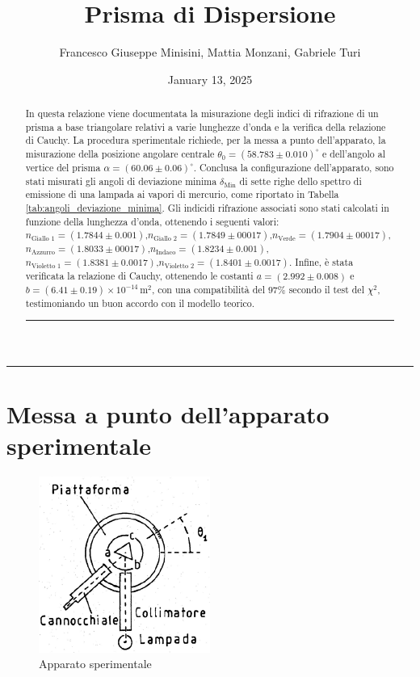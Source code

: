 \documentclass[a4paper,12pt]{article}
\title{Prisma di Dispersione}
\author{Francesco Giuseppe Minisini, Mattia Monzani, Gabriele Turi}
\date{January 13, 2025}
\begin{document}
\maketitle
\hrule
\vspace{9pt}
\begin{abstract}
\noindent
In questa relazione viene documentata la misurazione degli indici di rifrazione di un prisma a base triangolare relativi a varie lunghezze d'onda e la verifica della relazione di Cauchy. La procedura sperimentale richiede, per la messa a punto dell'apparato, la misurazione della posizione angolare centrale \(\theta_0 = (58.783 \pm 0.010)^\circ\) e dell'angolo al vertice del prisma \(\alpha = (60.06 \pm 0.06)^\circ\). Conclusa la configurazione dell'apparato, sono stati misurati gli angoli di deviazione minima \(\delta_{\text{Min}}\) di sette righe dello spettro di emissione di una lampada ai vapori di mercurio, come riportato in Tabella \ref{tab:angoli_deviazione_minima}. Gli indicidi rifrazione associati sono stati calcolati in funzione della lunghezza d'onda, ottenendo i seguenti valori: \(n_{\text{Giallo 1}} = (1.7844 \pm 0.001)\),\(n_{\text{Giallo 2}} = (1.7849 \pm 00017)\),\(n_{\text{Verde}} = (1.7904 \pm 00017)\),\(n_{\text{Azzurro}} = (1.8033 \pm 00017)\),\(n_{\text{Indaco}} = (1.8234 \pm 0.001)\),\(n_{\text{Violetto 1}} = (1.8381 \pm 0.0017)\),\(n_{\text{Violetto 2}} = (1.8401 \pm 0.0017)\).
Infine, è stata verificata la relazione di Cauchy, ottenendo le costanti \(a = (2.992 \pm 0.008)\) e \(b = (6.41 \pm 0.19) \times 10^{-14} \, \text{m}^2\), con una compatibilità del \(97\%\) secondo il test del \(\chi^2\), testimoniando un buon accordo con il modello teorico.
\vspace{20pt}
\hrule
\end{abstract}
\vspace{2 pt}

\section{Messa a punto dell'apparato sperimentale}

\begin{figure}[H]
    \centering
    \includegraphics[width=0.5\textwidth]{apparato.png}
    \caption{Apparato sperimentale}
    \label{fig:camera_millikan}
\end{figure}
\end{document}
